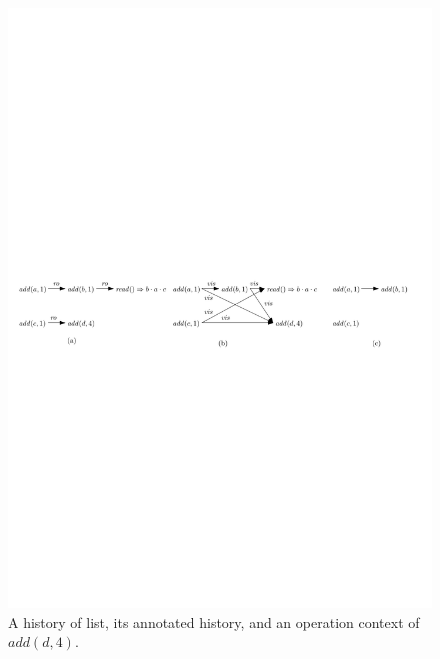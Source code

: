 

\begin{figure}[t]
  \centering
  \includegraphics[width=1 \textwidth]{figures/PIC-his-anhis-context-1.pdf}
  \caption{{A history of list, its annotated history, and an operation context of $\mathit{add}(d,4)$.}}

  \label{fig:history, annotated history and operation context}
\end{figure}


